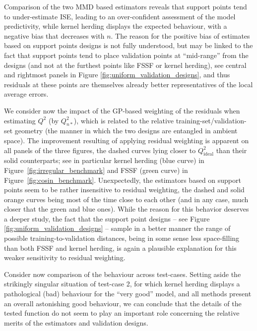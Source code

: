 Comparison of the two MMD based estimators reveals that support points tend to under-estimate ISE, leading to an over-confident assessment of the model predictivity, while kernel herding displays the expected behaviour, with a negative bias that decreases with $n$. The reason for the positive bias of estimates based on support points designs is not fully understood, but may be linked to the fact that support points tend to place validation points at ``mid-range'' from the designs (and not at the furthest points like FSSF or kernel herding), see central and rightmost panels in Figure \ref{fig:uniform_validation_designs}, and thus residuals at these points are themselves already better representatives of the local average errors. 

We consider now the impact of the GP-based weighting of the residuals when estimating $Q^2$ (by $Q_{n*}^2$), which is related to the relative training-set/validation-set geometry (the manner in which the two designs are entangled in  ambient space). The improvement resulting of applying residual weighting is apparent on all panels of the three figures, the dashed curves lying  closer to $Q_{\mathrm{ideal}}^2$ than their solid  counterparts;  see in particular kernel herding (blue curve) in Figure~\ref{fig:irregular_benchmark} and FSSF (green curve) in Figure~\ref{fig:cosin_benchmark}. Unexpectedly, the estimators based on support points seem to be rather insensitive to residual weighting, the dashed and solid orange curves being most of the time close to each other (and in any case, much closer that the green and blue ones). While the reason for this behavior deserves a deeper study, the fact that the support point designs -- see Figure \ref{fig:uniform_validation_designs} -- sample in a better manner the range of possible training-to-validation distances, being in some sense less space-filling than both FSSF and kernel herding, is again a plausible explanation for this weaker sensitivity to residual weighting.


Consider now comparison of the behaviour across test-cases. Setting aside the strikingly singular situation of test-case 2, for which kernel herding displays a pathological (bad) behaviour for the ``very good'' model, and all methods present an overall astonishing good  behaviour, we can conclude that the details of the tested function do not seem to play an important role concerning the relative merits of the estimators and validation designs.

